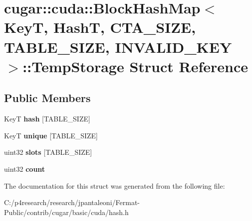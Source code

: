\hypertarget{structcugar_1_1cuda_1_1_block_hash_map_1_1_temp_storage}{}\section{cugar\+:\+:cuda\+:\+:Block\+Hash\+Map$<$ KeyT, HashT, C\+T\+A\+\_\+\+S\+I\+ZE, T\+A\+B\+L\+E\+\_\+\+S\+I\+ZE, I\+N\+V\+A\+L\+I\+D\+\_\+\+K\+EY $>$\+:\+:Temp\+Storage Struct Reference}
\label{structcugar_1_1cuda_1_1_block_hash_map_1_1_temp_storage}
\subsection*{Public Members}
\begin{DoxyCompactItemize}
\item 
\mbox{\label{structcugar_1_1cuda_1_1_block_hash_map_1_1_temp_storage_a1bd5161f728a7c8402507b74ea07fa38}} 
KeyT {\bfseries hash} \mbox{[}T\+A\+B\+L\+E\+\_\+\+S\+I\+ZE\mbox{]}
\item 
\mbox{\label{structcugar_1_1cuda_1_1_block_hash_map_1_1_temp_storage_aa21e811e6a7aa5858634b589aec08a38}} 
KeyT {\bfseries unique} \mbox{[}T\+A\+B\+L\+E\+\_\+\+S\+I\+ZE\mbox{]}
\item 
\mbox{\label{structcugar_1_1cuda_1_1_block_hash_map_1_1_temp_storage_a3e9432adfe9d00ae6591b7c2c3a5e050}} 
uint32 {\bfseries slots} \mbox{[}T\+A\+B\+L\+E\+\_\+\+S\+I\+ZE\mbox{]}
\item 
\mbox{\label{structcugar_1_1cuda_1_1_block_hash_map_1_1_temp_storage_a95a004c7c0eeba67939feda955696cb6}} 
uint32 {\bfseries count}
\end{DoxyCompactItemize}


The documentation for this struct was generated from the following file\+:\begin{DoxyCompactItemize}
\item 
C\+:/p4research/research/jpantaleoni/\+Fermat-\/\+Public/contrib/cugar/basic/cuda/hash.\+h\end{DoxyCompactItemize}
